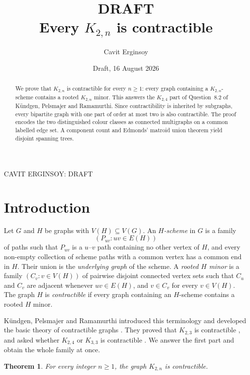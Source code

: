 \documentclass[11pt]{amsart}
\title[DRAFT: Every $K_{2,n}$ is contractible]
{\textbf{DRAFT}\\[0.5ex]
Every $K_{2,n}$ is contractible}
\author{Cavit Erginsoy}
\date{Draft, 16 August 2026}
\newtheorem{theorem}{Theorem}[section]
\begin{document}
\begin{abstract}
We prove that $K_{2,n}$ is contractible for every $n\geq1$: every graph
containing a $K_{2,n}$-scheme contains a rooted $K_{2,n}$ minor.  This
answers the $K_{2,4}$ part of Question~8.2 of K\"undgen, Pelsmajer and
Ramamurthi.  Since contractibility is inherited by subgraphs, every
bipartite graph with one part of order at most two is also contractible.
The proof encodes the two distinguished colour classes as connected
multigraphs on a common labelled edge set.  A component count and Edmonds'
matroid union theorem yield disjoint spanning trees.
\end{abstract}

\maketitle
{}
{CAVIT ERGINSOY: DRAFT}

\section{Introduction}

Let $G$ and $H$ be graphs with $V(H)\subseteq V(G)$.  An \emph{$H$-scheme}
in $G$ is a family
\[
                 (P_{uv}:uv\in E(H))
\]
of paths such that $P_{uv}$ is a $u$--$v$ path containing no other vertex
of $H$, and every non-empty collection of scheme paths with a common
vertex has a common end in $H$.  Their union is the \emph{underlying
graph} of the scheme.  A \emph{rooted $H$ minor} is a family
$(C_v:v\in V(H))$ of pairwise disjoint connected vertex sets such that
$C_u$ and $C_v$ are adjacent whenever $uv\in E(H)$, and $v\in C_v$ for
every $v\in V(H)$.  The graph $H$ is \emph{contractible} if every graph
containing an $H$-scheme contains a rooted $H$ minor.

K\"undgen, Pelsmajer and Ramamurthi introduced this terminology and
developed the basic theory of contractible graphs
\cite{KundgenPelsmajerRamamurthi2015}.  They proved that $K_{2,3}$ is
contractible \cite[Theorem~6.2]{KundgenPelsmajerRamamurthi2015}, and asked
whether $K_{2,4}$ or $K_{3,3}$ is contractible
\cite[Question~8.2]{KundgenPelsmajerRamamurthi2015}.  We answer the first
part and obtain the whole family at once.

\begin{theorem}\label{thm:main}
For every integer $n\geq1$, the graph $K_{2,n}$ is contractible.
\end{theorem}
\end{document}
